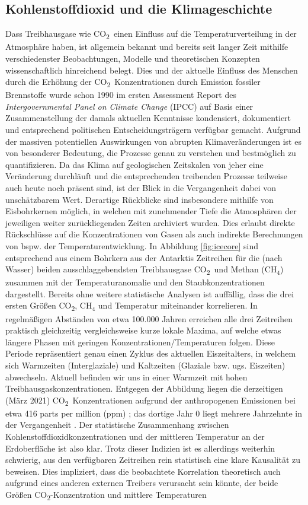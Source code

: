 \documentclass[12pt,a4paper,onecolumn]{scrartcl}
\newcommand{\cotwo}{CO\textsubscript{2}}
\begin{document}
\subsection{Kohlenstoffdioxid und die Klimageschichte} \label{sec:Klima}
Dass Treibhausgase wie \cotwo \ einen Einfluss auf die Temperaturverteilung in der Atmosphäre haben, ist allgemein bekannt und bereits seit langer Zeit mithilfe verschiedenster Beobachtungen, Modelle und theoretischen Konzepten wissenschaftlich hinreichend belegt. Dies und der aktuelle Einfluss des Menschen durch die Erhöhung der \cotwo \ Konzentrationen durch Emission fossiler Brennstoffe wurde schon 1990 im ersten Assessment Report des \textit{Intergovernmental Panel on Climate Change} (IPCC) auf Basis einer Zusammenstellung der damals aktuellen Kenntnisse kondensiert, dokumentiert und entsprechend politischen Entscheidungsträgern verfügbar gemacht. Aufgrund der massiven potentiellen Auswirkungen von abrupten Klimaveränderungen \citep{IPCCpol.2018} ist es von besonderer Bedeutung, die Prozesse genau zu verstehen und bestmöglich zu quantifizieren. Da das Klima auf geologischen Zeitskalen von jeher eine Veränderung durchläuft und die entsprechenden treibenden Prozesse teilweise auch heute noch präsent sind, ist der Blick in die Vergangenheit dabei von unschätzbarem Wert. Derartige Rückblicke sind insbesondere mithilfe von Eisbohrkernen möglich, in welchen mit zunehmender Tiefe die Atmosphären der jeweiligen weiter zurückliegenden Zeiten archiviert wurden. Dies erlaubt direkte Rückschlüsse auf die Konzentrationen von Gasen als auch indirekte Berechnungen von bspw. der Temperaturentwicklung. In Abbildung \ref{fig:icecore} sind entsprechend aus einem Bohrkern aus der Antarktis Zeitreihen für die (nach Wasser) beiden ausschlaggebendsten Treibhausgase \cotwo \ und Methan (CH$_4$) zusammen mit der Temperaturanomalie und den Staubkonzentrationen dargestellt. Bereits ohne weitere statistische Analysen ist auffällig, dass die drei ersten Größen \cotwo , CH$_4$ und Temperatur miteinander korrelieren. In regelmäßigen Abständen von etwa 100.000 Jahren erreichen alle drei Zeitreihen praktisch gleichzeitig vergleichsweise kurze lokale Maxima, auf welche etwas längere Phasen mit geringen Konzentrationen/Temperaturen folgen. Diese Periode repräsentiert genau einen Zyklus des aktuellen Eiszeitalters, in welchem sich Warmzeiten (Interglaziale) und Kaltzeiten (Glaziale bzw. ugs. Eiszeiten) abwechseln. Aktuell befinden wir uns in einer Warmzeit mit hohen Treibhausgaskonzentrationen. Entgegen der Abbildung liegen die derzeitigen (März 2021) \cotwo \ Konzentrationen aufgrund der anthropogenen Emissionen bei etwa 416 parts per million (ppm) \citep{NASA.06.05.2021}; das dortige Jahr 0 liegt mehrere Jahrzehnte in der Vergangenheit \citep{Luthi.2008}. Der statistische Zusammenhang zwischen Kohlenstoffdioxidkonzentrationen und der mittleren Temperatur an der Erdoberfläche ist also klar.  Trotz dieser Indizien ist es allerdings weiterhin schwierig, aus den verfügbaren Zeitreihen rein statistisch eine klare Kausalität zu beweisen. Dies impliziert, dass die beobachtete Korrelation theoretisch auch aufgrund eines anderen externen Treibers verursacht sein könnte, der beide Größen \cotwo -Konzentration und mittlere Temperaturen 
\end{document}
